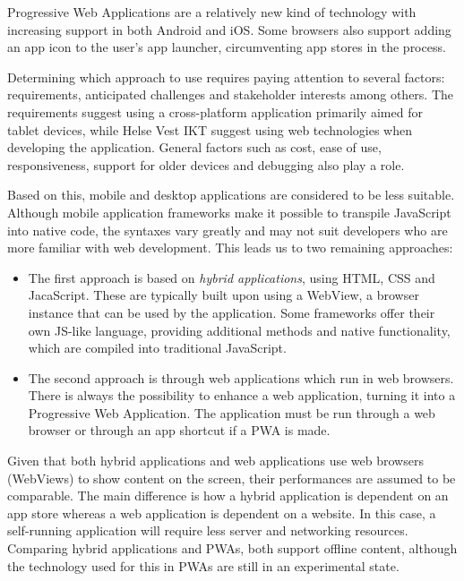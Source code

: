Progressive Web Applications are a relatively new kind of technology with increasing support in both Android and iOS. Some browsers also support adding an app icon to the user's app launcher, circumventing app stores in the process.


Determining which approach to use requires paying attention to several factors: requirements, anticipated challenges and stakeholder interests among others. The requirements suggest using a cross-platform application primarily aimed for tablet devices, while Helse Vest IKT suggest using web technologies when developing the application. General factors such as cost, ease of use, responsiveness, support for older devices and debugging also play a role. 

Based on this, mobile and desktop applications are considered to be less suitable. Although mobile application frameworks make it possible to transpile JavaScript into native code, the syntaxes vary greatly and may not suit developers who are more familiar with web development. This leads us to two remaining approaches:

\begin{itemize}
    \item The first approach is based on \emph{hybrid applications}, using HTML, CSS and JacaScript. These are typically built upon using a WebView, a browser instance that can be used by the application. Some frameworks offer their own JS-like language, providing additional methods and native functionality, which are compiled into traditional JavaScript.
    \item The second approach is through web applications which run in web browsers. There is always the possibility to enhance a web application, turning it into a Progressive Web Application. The application must be run through a web browser or through an app shortcut if a PWA is made.
\end{itemize}


Given that both hybrid applications and web applications use web browsers (WebViews) to show content on the screen, their performances are assumed to be comparable. The main difference is how a hybrid application is dependent on an app store whereas a web application is dependent on a website. In this case, a self-running application will require less server and networking resources. Comparing hybrid applications and PWAs, both support offline content, although the technology used for this in PWAs are still in an experimental state.

